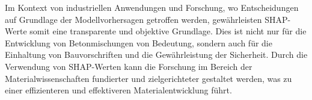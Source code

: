 Im Kontext von industriellen Anwendungen und Forschung, wo Entscheidungen auf Grundlage 
der Modellvorhersagen getroffen werden, gewährleisten SHAP-Werte somit eine transparente 
und objektive Grundlage. Dies ist nicht nur für die Entwicklung von Betonmischungen 
von Bedeutung, sondern auch für die Einhaltung von Bauvorschriften und die Gewährleistung 
der Sicherheit. Durch die Verwendung von SHAP-Werten kann die Forschung im Bereich 
der Materialwissenschaften fundierter und zielgerichteter gestaltet werden, was zu einer 
effizienteren und effektiveren Materialentwicklung führt.